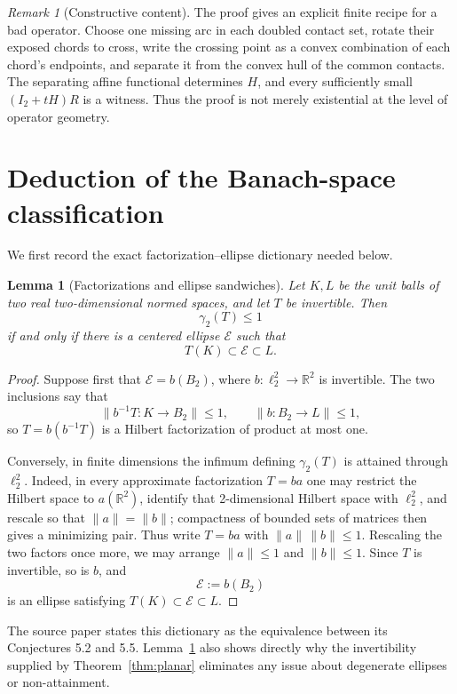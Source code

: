 \documentclass[11pt]{amsart}
\newtheorem{lemma}[theorem]{Lemma}
\theoremstyle{definition}
\theoremstyle{remark}
\newtheorem{remark}[theorem]{Remark}
\newcommand{\R}{\mathbb R}
\begin{document}
\begin{remark}[Constructive content]
The proof gives an explicit finite recipe for a bad operator.  Choose one
missing arc in each doubled contact set, rotate their exposed chords to cross,
write the crossing point as a convex combination of each chord's endpoints,
and separate it from the convex hull of the common contacts.  The separating
affine functional determines $H$, and every sufficiently small
$(I_2+tH)R$ is a witness.  Thus the proof is not merely existential at the
level of operator geometry.
\end{remark}

\section{Deduction of the Banach-space classification}\label{sec:banach}

We first record the exact factorization--ellipse dictionary needed below.

\begin{lemma}[Factorizations and ellipse sandwiches]\label{lem:dictionary}
Let $K,L$ be the unit balls of two real two-dimensional normed spaces, and
let $T$ be invertible.  Then
\[
 \gamma_2(T)\leq 1
\]
if and only if there is a centered ellipse $\mathcal E$ such that
\[
 T(K)\subset \mathcal E\subset L.
\]
\end{lemma}

\begin{proof}
Suppose first that $\mathcal E=b(B_2)$, where $b:\ell_2^2\to\R^2$ is
invertible.  The two inclusions say that
\[
 \|b^{-1}T:K\to B_2\|\leq1,
 \qquad
 \|b:B_2\to L\|\leq1,
\]
so $T=b(b^{-1}T)$ is a Hilbert factorization of product at most one.

Conversely, in finite dimensions the infimum defining $\gamma_2(T)$ is
attained through $\ell_2^2$.  Indeed, in every approximate factorization
$T=ba$ one may restrict the Hilbert space to $a(\R^2)$, identify that
2-dimensional Hilbert space with $\ell_2^2$, and rescale so that
$\|a\|=\|b\|$; compactness of bounded sets of matrices then gives a
minimizing pair.  Thus write $T=ba$ with $\|a\|\,\|b\|\leq1$.  Rescaling the
two factors once more, we may arrange $\|a\|\leq1$ and $\|b\|\leq1$.
Since $T$ is invertible, so is $b$, and
\[
 \mathcal E:=b(B_2)
\]
is an ellipse satisfying $T(K)\subset\mathcal E\subset L$.
\end{proof}

The source paper states this dictionary as the equivalence between its
Conjectures 5.2 and 5.5.  Lemma~\ref{lem:dictionary} also shows directly why
the invertibility supplied by Theorem~\ref{thm:planar} eliminates any issue
about degenerate ellipses or non-attainment.
\end{document}
